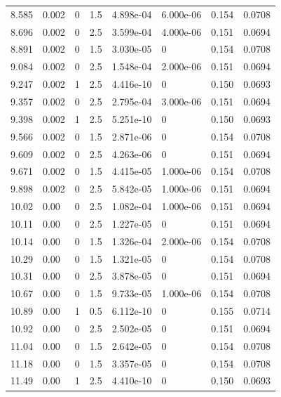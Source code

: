 \documentclass[preview]{standalone}
\begin{document}
{{{\begin{tabular}{L{1.2cm}C{1.2cm} C{0.3cm}C{0.5cm} C{1.4cm}C{1.4cm} C{1.4cm}C{1.4cm}}
  8.585  &  0.002  & 0     & 1.5 &  4.898e-04  & 6.000e-06  & 0.154 &  0.0708   \\ 
  8.696  &  0.002  & 0     & 2.5 &  3.599e-04  & 4.000e-06  & 0.151 &  0.0694   \\ 
  8.891  &  0.002  & 0     & 1.5 &  3.030e-05  & 0  & 0.154 &  0.0708   \\ 
  9.084  &  0.002  & 0     & 2.5 &  1.548e-04  & 2.000e-06  & 0.151 &  0.0694   \\ 
  9.247  &  0.002  & 1     & 2.5 &  4.416e-10  & 0  & 0.150 &  0.0693   \\ 
  9.357  &  0.002  & 0     & 2.5 &  2.795e-04  & 3.000e-06  & 0.151 &  0.0694   \\ 
  9.398  &  0.002  & 1     & 2.5 &  5.251e-10  & 0  & 0.150 &  0.0693   \\ 
  9.566  &  0.002  & 0     & 1.5 &  2.871e-06  & 0  & 0.154 &  0.0708   \\ 
  9.609  &  0.002  & 0     & 2.5 &  4.263e-06  & 0  & 0.151 &  0.0694   \\ 
  9.671  &  0.002  & 0     & 1.5 &  4.415e-05  & 1.000e-06  & 0.154 &  0.0708   \\ 
  9.898  &  0.002  & 0     & 2.5 &  5.842e-05  & 1.000e-06  & 0.151 &  0.0694   \\ 
  10.02  &  0.00  & 0     & 2.5 &  1.082e-04  & 1.000e-06  & 0.151 &  0.0694   \\ 
  10.11  &  0.00  & 0     & 2.5 &  1.227e-05  & 0  & 0.151 &  0.0694   \\ 
  10.14  &  0.00  & 0     & 1.5 &  1.326e-04  & 2.000e-06  & 0.154 &  0.0708   \\ 
  10.29  &  0.00  & 0     & 1.5 &  1.321e-05  & 0  & 0.154 &  0.0708   \\ 
  10.31  &  0.00  & 0     & 2.5 &  3.878e-05  & 0  & 0.151 &  0.0694   \\ 
  10.67  &  0.00  & 0     & 1.5 &  9.733e-05  & 1.000e-06  & 0.154 &  0.0708   \\ 
  10.89  &  0.00  & 1     & 0.5 &  6.112e-10  & 0  & 0.155 &  0.0714   \\ 
  10.92  &  0.00  & 0     & 2.5 &  2.502e-05  & 0  & 0.151 &  0.0694   \\ 
  11.04  &  0.00  & 0     & 1.5 &  2.642e-05  & 0  & 0.154 &  0.0708   \\ 
  11.18  &  0.00  & 0     & 1.5 &  3.357e-05  & 0  & 0.154 &  0.0708   \\ 
  11.49  &  0.00  & 1     & 2.5 &  4.410e-10  & 0  & 0.150 &  0.0693   \\ 

\end{tabular}}}}
\end{document}
